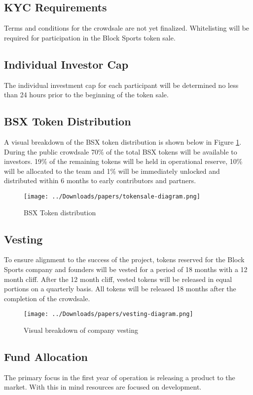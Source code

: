 \documentclass{article}
\begin{document}
	\subsection{KYC Requirements}
Terms and conditions for the crowdsale are not yet finalized. Whitelisting will be required for participation in the Block Sports token sale.

	\subsection{Individual Investor Cap}
The individual investment cap for each participant will be determined no less than 24 hours prior to the beginning of the token sale.

	\subsection{BSX Token Distribution}
A visual breakdown of the BSX token distribution is shown below in Figure \ref{figure:distribution}. During the public crowdsale 70\% of the total BSX tokens will be available to investors. 19\% of the remaining tokens will be held in operational reserve, 10\% will be allocated to the team and 1\% will be immediately unlocked and distributed within 6 months to early contributors and partners.

\begin{figure}[!htb]
\centering
\texttt{[image: ../Downloads/papers/tokensale-diagram.png]}
\caption{BSX Token distribution}
\label{figure:distribution}
\end{figure}

	\subsection{Vesting}
To ensure alignment to the success of the project, tokens reserved for the Block Sports company and founders will be vested for a period of 18 months with a 12 month cliff. After the 12 month cliff, vested tokens will be released in equal portions on a quarterly basis. All tokens will be released 18 months after the completion of the crowdsale.

\begin{figure}[!htb]
\centering
\texttt{[image: ../Downloads/papers/vesting-diagram.png]}
\caption{Visual breakdown of company vesting}
\label{figure:vesting}
\end{figure}


	\subsection{Fund Allocation}
The primary focus in the first year of operation is releasing a product to the market. With this in mind resources are focused on development.
\end{document}

